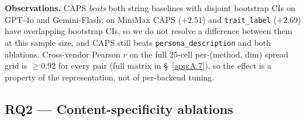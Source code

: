 \begin{table}[t]
\centering
{}
\caption{Mini-IPIP target-dimension spread on three commercial backbones under CAPS retrieval vs. two prompt baselines and two scaffolding ablations. CAPS is the only condition that combines a competitive spread with a near-zero collapse on the \texttt{wrong\_trait} ablation. Bootstrap 95\% CIs from 10{,}000 resamples.}
\label{tab:rq1-ablation}
\end{table}

\textbf{Observations.} CAPS \textit{beats} both string baselines with disjoint bootstrap CIs on GPT-4o and Gemini-Flash; on MiniMax CAPS ($+2.51$) and \texttt{trait\_\allowbreak{}label} ($+2.69$) have overlapping bootstrap CIs, so we do not resolve a difference between them at this sample size, and CAPS still beats \texttt{persona\_\allowbreak{}description} and both ablations. Cross-vendor Pearson $r$ on the full 25-cell per-(method, dim) spread grid is $\geq 0.92$ for every pair (full matrix in \S~\ref{app:A.7}), so the effect is a property of the representation, not of per-backend tuning.

\subsection{RQ2 --- Content-specificity ablations}
\label{sec:4.2}

